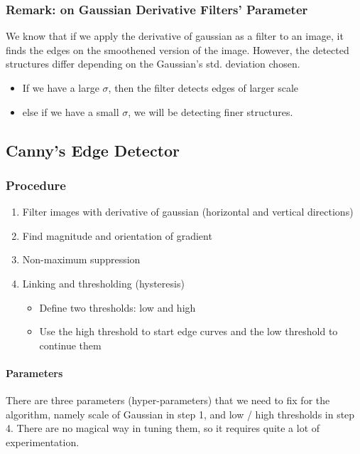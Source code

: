 \documentclass[11pt]{article}
\begin{document}
\subsubsection{Remark: on Gaussian Derivative Filters' Parameter}
We know that if we apply the derivative of gaussian as a filter to an image, it finds the edges on the smoothened version of the image. However, the detected structures differ depending on the Gaussian's std. deviation chosen. 
\begin{itemize}
	\item If we have a large $\sigma$, then the filter detects edges of larger scale
	\item else if we have a small $\sigma$, we will be detecting finer structures. 
\end{itemize}

\subsection{Canny's Edge Detector}
\subsubsection{Procedure}
\begin{enumerate}
	\item Filter images with derivative of gaussian (horizontal and vertical directions)
	\item Find magnitude and orientation of gradient
	\item Non-maximum suppression
	\item Linking and thresholding (hysteresis)
	\begin{itemize}
		\item Define two thresholds: low and high
		\item Use the high threshold to start edge curves and the low threshold to continue them
	\end{itemize}
\end{enumerate}

\paragraph{Parameters}
There are three parameters (hyper-parameters) that we need to fix for the algorithm, namely scale of Gaussian in step 1, and low / high thresholds in step 4. There are no magical way in tuning them, so it requires quite a lot of experimentation. 
\end{document}
